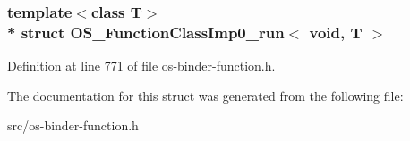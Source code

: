 \subsubsection*{template$<$class T$>$\\*
struct O\+S\+\_\+\+Function\+Class\+Imp0\+\_\+run$<$ void, T                           $>$}



Definition at line 771 of file os-\/binder-\/function.\+h.



The documentation for this struct was generated from the following file\+:\begin{DoxyCompactItemize}
\item 
src/os-\/binder-\/function.\+h\end{DoxyCompactItemize}
